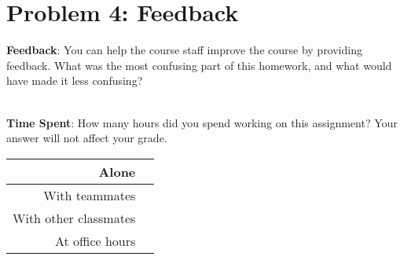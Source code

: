 \documentclass[12pt]{article}
\begin{document}
\section*{Problem 4: Feedback}

\textbf{Feedback}: You can help the course staff improve the course by providing feedback. What was the most confusing part of this homework, and what would have made it less confusing?

\begin{tcolorbox}[fit,height=10em, width=40em, blank, borderline={1pt}{1pt},nobeforeafter]
            \begin{center}
            \end{center}
            \end{tcolorbox}\\

\noindent\textbf{Time Spent}: How many hours did you spend working on this assignment? Your answer will not affect your grade.

\begin{tcolorbox}[fit,height=10em, width=40em, blank, borderline={1pt}{1pt},nobeforeafter]
\begin{table}[H]
    \centering
    \begin{tabular}{r|c}
        Alone &  \hspace{3em} %
        \\ \hline
        With teammates & \hspace{3em} %
        \\ \hline
        With other classmates & \hspace{3em} %
        \\ \hline
        At office hours & \hspace{3em} %
        \\ \hline
    \end{tabular}
\end{table}
\end{tcolorbox}
\end{document}
